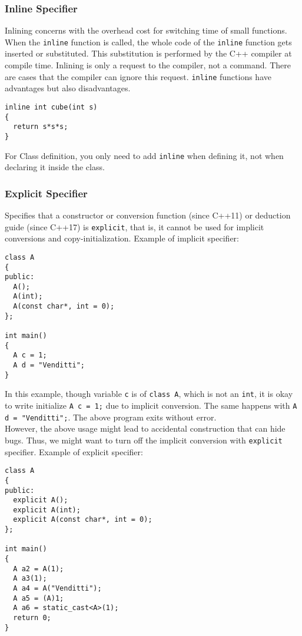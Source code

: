 \subsubsection{Inline Specifier}

Inlining concerns with the overhead cost for switching time of small functions. When the \verb|inline| function is called, the whole code of the \verb|inline| function gets inserted or substituted. This substitution is performed by the C++ compiler at compile time. Inlining is only a request to the compiler, not a command. There are cases that the compiler can ignore this request. \verb|inline| functions have advantages but also disadvantages.
\begin{verbatim}
inline int cube(int s)
{
  return s*s*s;
}
\end{verbatim}

For Class definition, you only need to add \verb|inline| when defining it, not when declaring it inside the class.

\subsubsection{Explicit Specifier}

Specifies that a constructor or conversion function (since C++11) or deduction guide (since C++17) is \verb|explicit|, that is, it cannot be used for implicit conversions and copy-initialization. Example of implicit specifier:
\begin{verbatim}
class A
{
public:
  A();
  A(int);
  A(const char*, int = 0);
};

int main()
{
  A c = 1;
  A d = "Venditti";
}
\end{verbatim}

In this example, though variable \texttt{c} is of \texttt{class A}, which is not an \texttt{int}, it is okay to write initialize \texttt{A c = 1;} due to implicit conversion. The same happens with \texttt{A d = "Venditti";}. The above program exits without error.\\

However, the above usage might lead to accidental construction that can hide bugs. Thus, we might want to turn off the implicit conversion with \texttt{explicit} specifier. Example of explicit specifier:
\begin{verbatim}
class A
{
public:
  explicit A();
  explicit A(int);
  explicit A(const char*, int = 0);
};

int main()
{
  A a2 = A(1);
  A a3(1);
  A a4 = A("Venditti");
  A a5 = (A)1;
  A a6 = static_cast<A>(1);
  return 0;
}
\end{verbatim}

